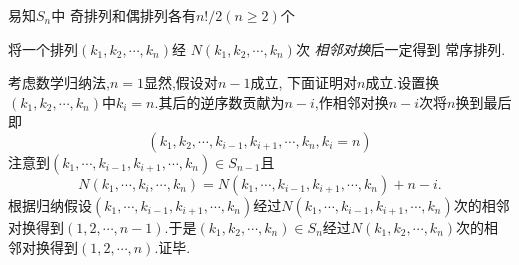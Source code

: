 \begin{green}
\begin{corollary}[奇偶排列数量]\label{cor:奇偶排列数量}
    易知$S_n$中
奇排列和偶排列各有$n! / 2\left(n\geqslant 2\right)$个
\end{corollary}
\end{green}
\begin{formal}
\begin{theorem}[逆序数的实际意义]\label{thm:逆序数的实际意义}
    将一个排列$\left(k_1,k_2,\cdots,k_n\right)$经
$N\left(k_1,k_2,\cdots,k_n\right)$次\emph{
    相邻对换}后一定得到
常序排列.
\end{theorem}
\begin{Proof}
考虑数学归纳法,$n=1$显然,假设对$n-1$成立,
下面证明对$n$成立.设置换$\left(k_1,k_2,\cdots,k_n\right)$中$k_i=n$.其后的逆序数贡献为$n-i$,作相邻对换$n-i$次将$n$换到最后即\[
\left(
    k_1,k_2,\cdots,k_{i-1},k_{i+1},\cdots,k_n,k_i=n
\right)
\]注意到$\left(k_1,\cdots,k_{i-1},k_{i+1},\cdots,k_n\right)\in S_{n-1}$且\[N\left(k_1,\cdots,k_i,\cdots,k_n\right)=N\left(k_1,\cdots,k_{i-1},k_{i+1},\cdots,k_n\right)+n-i.\]根据归纳假设$\left(k_1,\cdots,k_{i-1},k_{i+1},\cdots,k_n\right)$经过$N\left(k_1,\cdots,k_{i-1},k_{i+1},\cdots,k_n\right)$次的相邻对换得到$\left(1,2,\cdots,n-1\right)$.于是$\left(k_1,k_2,\cdots,k_n\right)\in S_n$经过$N\left(k_1,k_2,\cdots,k_n\right)$次的相邻对换得到$\left(1,2,\cdots,n\right)$.证毕.
\end{Proof}
\end{formal}
